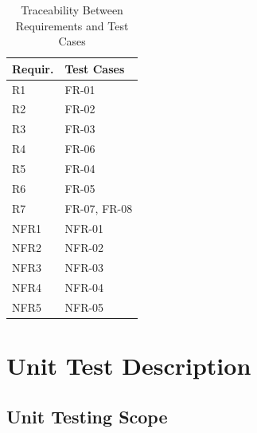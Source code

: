 \documentclass[12pt, titlepage]{article}
\begin{document}
\begin{table}[h]
\centering
\begin{tabularx}{0.9\textwidth}{p{2.2cm}X}
\toprule
\textbf{Requir.} & \textbf{Test Cases} \\
\midrule
R1  & FR-01 \\
R2  & FR-02 \\
R3  & FR-03 \\
R4  & FR-06 \\
R5  & FR-04 \\
R6  & FR-05 \\
R7  & FR-07, FR-08 \\
\midrule
NFR1 & NFR-01 \\
NFR2 & NFR-02 \\
NFR3 & NFR-03 \\
NFR4 & NFR-04 \\
NFR5 & NFR-05 \\
\bottomrule
\end{tabularx}
\caption{Traceability Between Requirements and Test Cases}
\label{Table:Req_Test_Trace}
\end{table}



\section{Unit Test Description}




\subsection{Unit Testing Scope}
\end{document}
